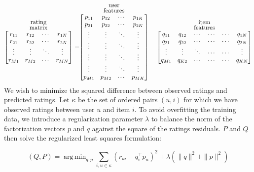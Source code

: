 \documentclass{article} %
\DeclareMathOperator*{\argmin}{arg\,min}
\begin{document}
\[
  \stackrel{\stackrel{\mbox{rating}}{\mbox{matrix}}}{%
    \begin{bmatrix}
    r_{11} & r_{12} & \cdots & r_{1N} \\
    r_{21} & r_{22} & \cdots & r_{2N} \\
    \vdots & \vdots & \ddots & \vdots \\
    r_{M1} & r_{M2} & \cdots & r_{MN}
    \end{bmatrix}%
  }\ = 
  \stackrel{\stackrel{\mbox{user}}{\mbox{features}}}{%
    \begin{bmatrix}
    p_{11} & p_{12} & \cdots & p_{1K} \\
    p_{21} & p_{22} & \cdots & p_{2K} \\
    \vdots & \vdots & \ddots & \vdots \\
    \vdots & \vdots & \ddots & \vdots \\
    \vdots & \vdots & \ddots & \vdots \\
    \vdots & \vdots & \ddots & \vdots \\
    p_{M1} & p_{M2} & \cdots & p_{MK}
    \end{bmatrix}%
  }\ \quad
  \stackrel{\stackrel{\mbox{item}}{\mbox{features}}}{%
    \begin{bmatrix}
    q_{11} & q_{12} & \cdots & \cdots & \cdots & q_{1N} \\
    q_{21} & q_{22} & \cdots & \cdots & \cdots & q_{2N} \\
    \vdots & \vdots & \ddots & \cdots & \cdots & \vdots \\
    q_{M1} & q_{K2} & \cdots & \cdots & \cdots & q_{KN}
    \end{bmatrix}%
   }
\]
We wish to minimize the squared difference between observed ratings and predicted ratings. Let $\kappa$ be the set of ordered pairs $(u,i)$ for which we have observed ratings between user $u$ and item $i$. To avoid overfitting the training data, we introduce a regularization parameter $\lambda$ to balance the norm of the factorization vectors $p$ and $q$ against the square of the ratings residuals. $P$ and $Q$ then solve the regularized least squares formulation:

\begin{equation}
    (Q, P) = \argmin_{q, p} \sum_{i,u \in \kappa} (r_{ui}-q_i^\intercal p_u)^2 + \lambda( \|q\|^2 + \|p\|^2)
\end{equation}
\end{document}
